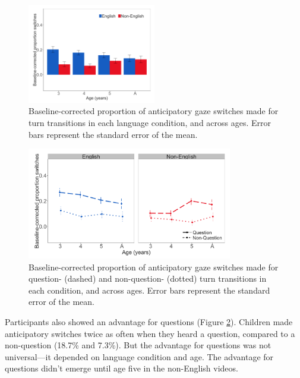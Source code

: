 \documentclass[authoryear, 12pt]{elsarticle}
\begin{document}
\begin{figure}[t]
\begin{center}
\includegraphics[width=0.5\textwidth]{figures/FIG-conditions-FL.png}
\end{center}
\caption{Baseline-corrected proportion of anticipatory gaze switches made for turn transitions in each language condition, and across ages. Error bars represent the standard error of the mean.} 
\label{fig:conditionsFL}
\end{figure}

\begin{figure}[t]
\begin{center}
\includegraphics[width=0.8\textwidth]{figures/FIG-QvsNQ-FL.png}
\end{center}
\caption{Baseline-corrected proportion of anticipatory gaze switches made for question- (dashed) and non-question- (dotted) turn transitions in each condition, and across ages. Error bars represent the standard error of the mean.} 
\label{fig:questionsFL}
\end{figure}

Participants also showed an advantage for questions (Figure \ref{fig:questionsFL}). Children made anticipatory switches twice as often when they heard a question, compared to a non-question (18.7\% and 7.3\%). But the advantage for questions was not universal---it depended on language condition and age. The advantage for questions didn't emerge until age five in the non-English videos.
\end{document}

